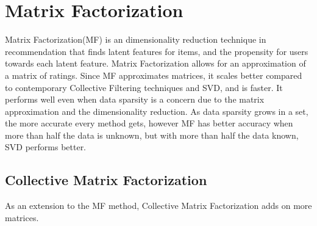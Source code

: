 \section{Matrix Factorization} \label{bg:matrixfactorization}
Matrix Factorization(MF) is an dimensionality reduction technique in recommendation that finds latent features for items, and the propensity for users towards each latent feature. 
Matrix Factorization allows for an approximation of a matrix of ratings.
Since MF approximates matrices, it scales better compared to contemporary Collective Filtering techniques and SVD, and is faster. It performs well even when data sparsity is a concern due to the matrix approximation and the dimensionality reduction.
As data sparsity grows in a set, the more accurate every method gets, however MF has better accuracy when more than half the data is unknown, but with more than half the data known, SVD performs better.
\subsection{Collective Matrix Factorization}
As an extension to the MF method, Collective Matrix Factorization adds on more matrices.
